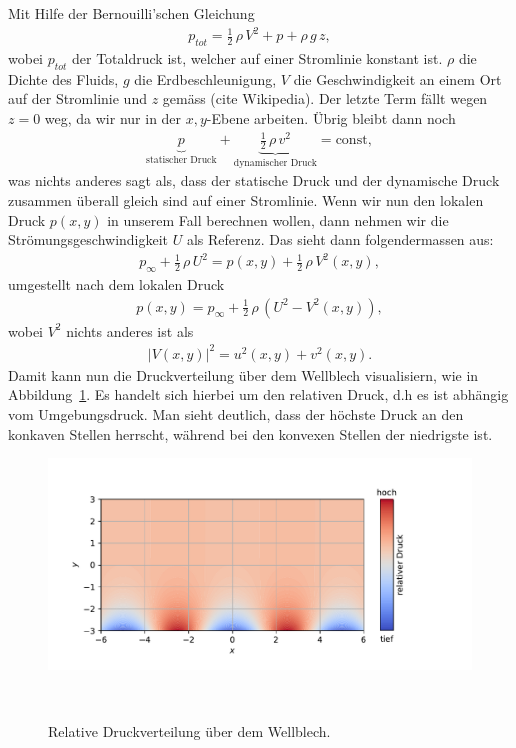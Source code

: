 Mit Hilfe der Bernouilli'schen Gleichung
\begin{align*}
    p_{tot}
    =
    \frac{1}{2}\,\rho\,V^2
    +
    p
    +
    \rho\,g\,z,
\end{align*}
wobei $p_{tot}$ der Totaldruck ist, welcher
auf einer Stromlinie konstant ist.
$\rho$ die Dichte des Fluids, $g$ die Erdbeschleunigung,
$V$ die Geschwindigkeit an einem Ort auf der Stromlinie
und $z$ gemäss (cite Wikipedia).
Der letzte Term fällt wegen $z=0$ weg, da wir nur in 
der $x,y$-Ebene arbeiten.
Übrig bleibt dann noch
\begin{align*}
    \underbrace{p}_{\text{statischer Druck}} 
    +
    \underbrace{\frac{1}{2}\,\rho\,v^2}_{\text{dynamischer Druck}}
    =
    \mathrm{const},
\end{align*}
was nichts anderes sagt als, dass der statische Druck und der 
dynamische Druck zusammen überall gleich sind auf einer Stromlinie.
Wenn wir nun den lokalen Druck $p(x,y)$ in unserem Fall berechnen wollen,
dann nehmen wir die Strömungsgeschwindigkeit $U$ als Referenz.
Das sieht dann folgendermassen aus:
\begin{align*}
    p_\infty
    +
    \frac{1}{2}\,\rho\,U^2
    =
    p(x,y)
    +
    \frac{1}{2}\,\rho\,V^2(x,y),
\end{align*}
umgestellt nach dem lokalen Druck
\begin{align*}
    p(x,y)
    =
    p_\infty
    +
    \frac{1}{2}\,\rho\,(U^2-V^2(x,y)),
\end{align*}
wobei $V^2$ nichts anderes ist als
\begin{align*}
    |V(x,y)|^2 = u^2(x,y) + v^2(x,y).
\end{align*}
Damit kann nun die Druckverteilung über dem Wellblech visualisiern,
wie in Abbildung~\ref{fig:druckverteilung}.
Es handelt sich hierbei um den relativen Druck,
d.h es ist abhängig vom Umgebungsdruck.
Man sieht deutlich, dass der höchste Druck an den konkaven Stellen herrscht,
während bei den konvexen Stellen der niedrigste ist.
\begin{figure}
    \centering
    \includegraphics[width=\textwidth]{papers/ueberschall/figures/Druckverteilung.pdf}
    \caption{Relative Druckverteilung über dem Wellblech.}
    ~\label{fig:druckverteilung}  
\end{figure}

